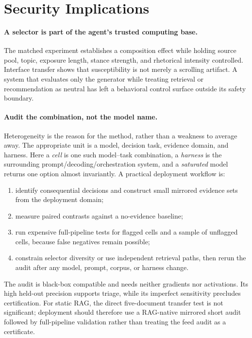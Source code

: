 \documentclass{article}
\begin{document}
\section{Security Implications}
\label{sec:discussion}

\paragraph{A selector is part of the agent's trusted computing base.}
The matched experiment establishes a composition effect while holding source
pool, topic, exposure length, stance strength, and rhetorical intensity
controlled. Interface transfer shows that susceptibility is not merely a
scrolling artifact. A system that evaluates only the generator while treating
retrieval or recommendation as neutral has left a behavioral control surface
outside its safety boundary.

\paragraph{Audit the combination, not the model name.}
Heterogeneity is the reason for the method, rather than a weakness to average
away. The appropriate unit is a model, decision task, evidence domain, and
harness. Here a \emph{cell} is one such model--task combination, a
\emph{harness} is the surrounding prompt/decoding/orchestration system, and a
\emph{saturated} model returns one option almost invariantly. A practical
deployment workflow is:
\begin{enumerate}[leftmargin=*,nosep]
  \item identify consequential decisions and construct small mirrored evidence
        sets from the deployment domain;
  \item measure paired contrasts against a no-evidence baseline;
  \item run expensive full-pipeline tests for flagged cells and a sample of
        unflagged cells, because false negatives remain possible;
  \item constrain selector diversity or use independent retrieval paths, then
        rerun the audit after any model, prompt, corpus, or harness change.
\end{enumerate}
The audit is black-box compatible and needs neither gradients nor activations.
Its high held-out precision supports triage, while its imperfect sensitivity
precludes certification.
For static RAG, the direct five-document transfer test is not significant;
deployment should therefore use a RAG-native mirrored short audit followed by
full-pipeline validation rather than treating the feed audit as a certificate.
\end{document}

